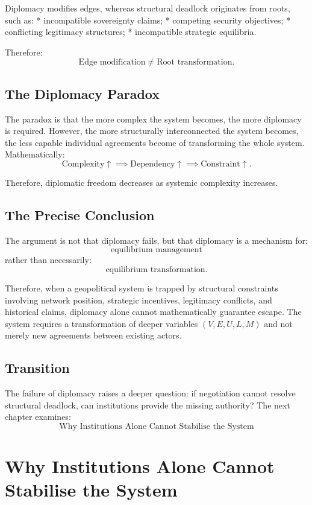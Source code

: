 \documentclass[11pt,openany]{book}
\theoremstyle{plain}
\theoremstyle{definition}
\begin{document}
Diplomacy modifies edges, whereas structural deadlock originates from roots, such as:
* incompatible sovereignty claims;
* competing security objectives;
* conflicting legitimacy structures;
* incompatible strategic equilibria.

Therefore:
\[
\text{Edge modification}
\neq
\text{Root transformation}.
\]

\section*{The Diplomacy Paradox}

The paradox is that the more complex the system becomes, the more diplomacy is required. However, the more structurally interconnected the system becomes, the less capable individual agreements become of transforming the whole system. Mathematically:
\[
\text{Complexity} \uparrow \implies \text{Dependency} \uparrow \implies \text{Constraint} \uparrow.
\]

Therefore, diplomatic freedom decreases as systemic complexity increases.

\section*{The Precise Conclusion}

The argument is not that diplomacy fails, but that diplomacy is a mechanism for:
\[
\boxed{
\text{equilibrium management}
}
\]
rather than necessarily:
\[
\boxed{
\text{equilibrium transformation.}
}
\]

Therefore, when a geopolitical system is trapped by structural constraints involving network position, strategic incentives, legitimacy conflicts, and historical claims, diplomacy alone cannot mathematically guarantee escape. The system requires a transformation of deeper variables \((V, E, U, L, M)\) and not merely new agreements between existing actors.

\section*{Transition}

The failure of diplomacy raises a deeper question: if negotiation cannot resolve structural deadlock, can institutions provide the missing authority? The next chapter examines:
\[
\boxed{
\text{Why Institutions Alone Cannot Stabilise the System}
}
\]

\chapter{Why Institutions Alone Cannot Stabilise the System}
\end{document}
